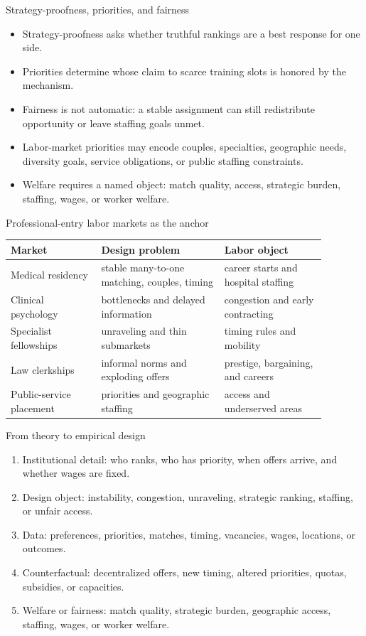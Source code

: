 \documentclass[aspectratio=169,11pt]{beamer}
\begin{document}
\begin{frame}{Strategy-proofness, priorities, and fairness}
\begin{itemize}
    \item Strategy-proofness asks whether truthful rankings are a best response for one side.
    \item Priorities determine whose claim to scarce training slots is honored by the mechanism.
    \item Fairness is not automatic: a stable assignment can still redistribute opportunity or leave staffing goals unmet.
    \item Labor-market priorities may encode couples, specialties, geographic needs, diversity goals, service obligations, or public staffing constraints.
    \item Welfare requires a named object: match quality, access, strategic burden, staffing, wages, or worker welfare.
\end{itemize}
\end{frame}

\begin{frame}{Professional-entry labor markets as the anchor}
\small
\begin{tabular}{p{0.25\linewidth} p{0.34\linewidth} p{0.29\linewidth}}
\toprule
Market & Design problem & Labor object \\
\midrule
Medical residency & stable many-to-one matching, couples, timing & career starts and hospital staffing \\
Clinical psychology & bottlenecks and delayed information & congestion and early contracting \\
Specialist fellowships & unraveling and thin submarkets & timing rules and mobility \\
Law clerkships & informal norms and exploding offers & prestige, bargaining, and careers \\
Public-service placement & priorities and geographic staffing & access and underserved areas \\
\bottomrule
\end{tabular}
\end{frame}

\begin{frame}{From theory to empirical design}
\begin{enumerate}
    \item Institutional detail: who ranks, who has priority, when offers arrive, and whether wages are fixed.
    \item Design object: instability, congestion, unraveling, strategic ranking, staffing, or unfair access.
    \item Data: preferences, priorities, matches, timing, vacancies, wages, locations, or outcomes.
    \item Counterfactual: decentralized offers, new timing, altered priorities, quotas, subsidies, or capacities.
    \item Welfare or fairness: match quality, strategic burden, geographic access, staffing, wages, or worker welfare.
\end{enumerate}
\end{frame}
\end{document}
